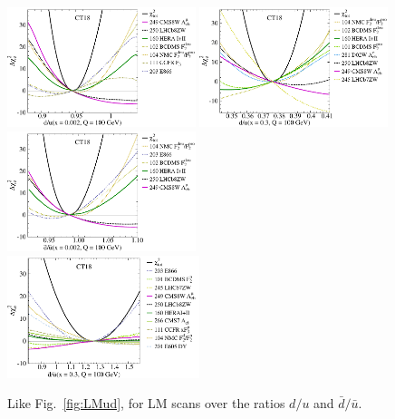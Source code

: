 %
\begin{figure}[tb]
	\center
	\includegraphics[width=0.49\textwidth]{./fig/LM/pib23hTndou2E-3p0_00E0_LM27-_10_x2_00E-03_Q1_00E+02_DEchi2_re0_ect.pdf} %
	\includegraphics[width=0.49\textwidth]{./fig/LM/pib23hTndou3E-1p0_00E0_LM27-_10_x3_00E-01_Q1_00E+02_DEchi2_re0_ect.pdf}\\ %
	\includegraphics[width=0.49\textwidth]{./fig/LM/pib23hTndboub2E-3p0_00E0_LM27-_11_x2_00E-03_Q1_00E+02_DEchi2_re0_ect.pdf}%
	\includegraphics[width=0.5\textwidth]{./fig/LM/pjb02a20_LM25-_11_x3_00E-01_Q1_00E+02_DEchi2_re0.pdf}\\ %

	\caption{Like Fig.~\ref{fig:LMud}, for LM scans over the
          ratios $d/u$ and $\bar d/\bar u$. 
		}
\label{fig:LMduratios}
\end{figure}


